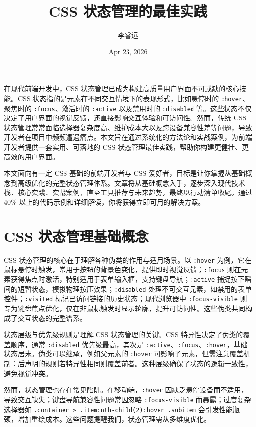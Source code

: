 \title{CSS 状态管理的最佳实践}
\author{李睿远}
\date{Apr 23, 2026}
\maketitle
在现代前端开发中，CSS 状态管理已成为构建高质量用户界面不可或缺的核心技能。CSS 状态指的是元素在不同交互情境下的表现形式，比如悬停时的 \texttt{:hover}、聚焦时的 \texttt{:focus}、激活时的 \texttt{:active} 以及禁用时的 \texttt{:disabled} 等。这些状态不仅决定了用户界面的视觉反馈，还直接影响交互体验和可访问性。然而，传统 CSS 状态管理常常面临选择器复杂度高、维护成本大以及跨设备兼容性差等问题，导致开发者在项目中频频遭遇痛点。本文旨在通过系统化的方法论和实战案例，为前端开发者提供一套实用、可落地的 CSS 状态管理最佳实践，帮助你构建更健壮、更高效的用户界面。\par
本文面向有一定 CSS 基础的前端开发者与 CSS 爱好者，目标是让你掌握从基础概念到高级优化的完整状态管理体系。文章将从基础概念入手，逐步深入现代技术栈、核心实践、实战案例，直至工具推荐与未来趋势，最终以行动清单收尾。通过 40\%{} 以上的代码示例和详细解读，你将获得立即可用的解决方案。\par
\chapter{CSS 状态管理基础概念}
CSS 状态管理的核心在于理解各种伪类的作用与适用场景。以 \texttt{:hover} 为例，它在鼠标悬停时触发，常用于按钮的背景色变化，提供即时视觉反馈；\texttt{:focus} 则在元素获得焦点时激活，特别适用于表单输入框，支持键盘导航；\texttt{:active} 捕捉按下瞬间的短暂状态，模拟物理按压效果；\texttt{:disabled} 处理不可交互元素，如禁用的表单控件；\texttt{:visited} 标记已访问链接的历史状态；现代浏览器中 \texttt{:focus-visible} 则专为键盘焦点优化，仅在非鼠标触发时显示轮廓，提升可访问性。这些伪类共同构成了交互状态的完整谱系。\par
状态层级与优先级规则是理解 CSS 状态管理的关键。CSS 特异性决定了伪类的覆盖顺序，通常 \texttt{:disabled} 优先级最高，其次是 \texttt{:active}、\texttt{:focus}、\texttt{:hover}，基础状态居末。伪类可以继承，例如父元素的 \texttt{:hover} 可影响子元素，但需注意覆盖机制：后声明的规则若特异性相同则覆盖前者。这种层级确保了状态的逻辑一致性，避免视觉冲突。\par
然而，状态管理也存在常见陷阱。在移动端，\texttt{:hover} 因缺乏悬停设备而不适用，导致交互缺失；键盘导航兼容性问题常因忽略 \texttt{:focus-visible} 而暴露；过度复杂选择器如 \texttt{.container > .item:nth-child(2):hover .subitem} 会引发性能瓶颈，增加重绘成本。这些问题提醒我们，状态管理需从多维度优化。\par
